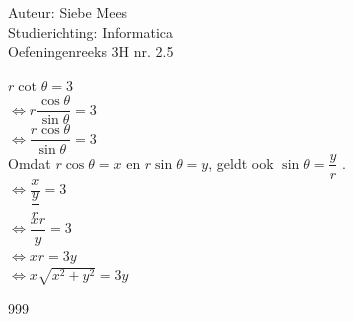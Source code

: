 \documentclass[a4paper]{article}
\begin{document}
  
\noindent \large Auteur: Siebe Mees \\
\noindent \large Studierichting: Informatica\\
\noindent \large Oefeningenreeks 3H nr. 2.5\\

\medskip

\normalsize

$r\cot\theta=3$\\

$\Leftrightarrow r\dfrac{\cos\theta}{\sin\theta}=3$\\

$\Leftrightarrow \dfrac{r\cos\theta}{\sin\theta}=3$\\

Omdat $r\cos\theta=x$ en $r\sin\theta=y$, geldt ook $ \sin\theta=\dfrac{y}{r}$ .\\

$\Leftrightarrow \dfrac{x}{\dfrac{y}{r}}=3$\\

$\Leftrightarrow \dfrac{xr}{y}=3$\\

$\Leftrightarrow xr=3y$\\

$\Leftrightarrow x\sqrt{x^2+y^2}=3y$\\

\begin{thebibliography}{999}
\end{thebibliography}
\end{document}
